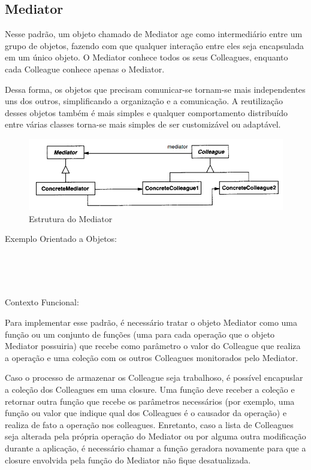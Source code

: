\subsection{Mediator}

Nesse padrão, um objeto chamado de Mediator age como intermediário 
entre um grupo de objetos, fazendo com que qualquer interação entre 
eles seja encapsulada em um único objeto. O Mediator conhece todos 
os seus Colleagues, enquanto cada Colleague conhece apenas o 
Mediator.

Dessa forma, os objetos que precisam comunicar-se tornam-se 
mais independentes uns dos outros, simplificando a organização e 
a comunicação. A reutilização desses objetos também é mais simples 
e qualquer comportamento distribuído entre várias classes torna-se 
mais simples de ser customizável ou adaptável.

\begin{figure}[htb]
	\caption{\label{fig_grafico}Estrutura do Mediator}
	\begin{center}
	    \includegraphics[scale=0.5]{5_padroes-contexto-funcional/5.3_comportamentais/5.3.05_mediator/diagram.png}
	\end{center}
\end{figure}

Exemplo Orientado a Objetos:

\begin{lstlisting}[caption={Mediator Orientação a Objetos},label=oomediator]


    
\end{lstlisting}

Contexto Funcional:

Para implementar esse padrão, é necessário tratar o objeto 
Mediator como uma função ou um conjunto de funções (uma para 
cada operação que o objeto Mediator possuiria) que recebe 
como parâmetro o valor do Colleague que realiza a operação 
e uma coleção com os outros Colleagues monitorados pelo 
Mediator.

Caso o processo de armazenar os Colleague seja trabalhoso, 
é possível encapuslar a coleção dos Colleagues em uma 
closure. Uma função deve receber a coleção e retornar 
outra função que recebe os parâmetros necessários (por 
exemplo, uma função ou valor que indique qual dos Colleagues 
é o causador da operação) e realiza de fato a operação 
nos colleagues. Enretanto, caso a lista de Colleagues 
seja alterada pela própria operação do Mediator ou por 
alguma outra modificação durante a aplicação, é necessário 
chamar a função geradora novamente para que a closure 
envolvida pela função do Mediator não fique desatualizada.

\begin{lstlisting}[caption={Mediator Funcional},label=fpmediator]
    

    
\end{lstlisting}